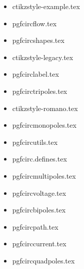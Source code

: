 \documentclass[a4paper, papersize, dvipdfmx, bold]{jsarticle}
\begin{document}
\begin{itemize}
  \item ctikzstyle-example.tex
  \item pgfcircflow.tex
  \item pgfcircshapes.tex
  \item ctikzstyle-legacy.tex
  \item pgfcirclabel.tex
  \item pgfcirctripoles.tex
  \item ctikzstyle-romano.tex
  \item pgfcircmonopoles.tex
  \item pgfcircutils.tex
  \item pgfcirc.defines.tex
  \item pgfcircmultipoles.tex
  \item pgfcircvoltage.tex
  \item pgfcircbipoles.tex
  \item pgfcircpath.tex
  \item pgfcirccurrent.tex
  \item pgfcircquadpoles.tex
\end{itemize}
\end{document}
